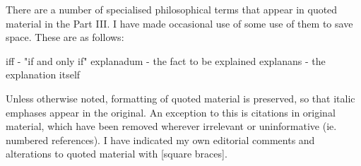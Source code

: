 There are a number of specialised philosophical terms that appear in quoted material in the Part III. I have made occasional use of some use of them to save space. These are as follows:

iff - "if and only if"
explanadum - the fact to be explained
explanans - the explanation itself 

Unless otherwise noted, formatting of quoted material is preserved, so that italic emphases appear in the original. An exception to this is citations in original material, which have been removed wherever irrelevant or uninformative (ie. numbered references). I have indicated my own editorial comments and alterations to quoted material with [square braces].